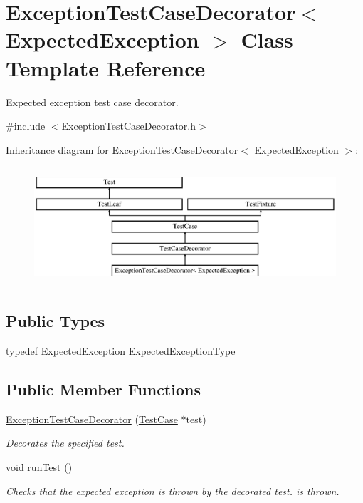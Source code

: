 \hypertarget{class_exception_test_case_decorator}{\section{Exception\-Test\-Case\-Decorator$<$ Expected\-Exception $>$ Class Template Reference}
\label{class_exception_test_case_decorator}
}


Expected exception test case decorator.  




{\ttfamily \#include $<$Exception\-Test\-Case\-Decorator.\-h$>$}

Inheritance diagram for Exception\-Test\-Case\-Decorator$<$ Expected\-Exception $>$\-:\begin{figure}[H]
\begin{center}
\leavevmode
\includegraphics[height=4.444445cm]{class_exception_test_case_decorator}
\end{center}
\end{figure}
\subsection*{Public Types}
\begin{DoxyCompactItemize}
\item 
typedef Expected\-Exception \hyperlink{class_exception_test_case_decorator_a3fc7e11a4aa1730fa98ff6ac52958ae9}{Expected\-Exception\-Type}
\end{DoxyCompactItemize}
\subsection*{Public Member Functions}
\begin{DoxyCompactItemize}
\item 
\hyperlink{class_exception_test_case_decorator_a01b0c42952450cff574dd9e293c718fa}{Exception\-Test\-Case\-Decorator} (\hyperlink{class_test_case}{Test\-Case} $\ast$test)
\begin{DoxyCompactList}\small\item\em Decorates the specified test. \end{DoxyCompactList}\item 
\hyperlink{wglew_8h_aeea6e3dfae3acf232096f57d2d57f084}{void} \hyperlink{class_exception_test_case_decorator_a3f78294d459a94f55413162d814f291d}{run\-Test} ()
\begin{DoxyCompactList}\small\item\em Checks that the expected exception is thrown by the decorated test. is thrown. \end{DoxyCompactList}\end{DoxyCompactItemize}
